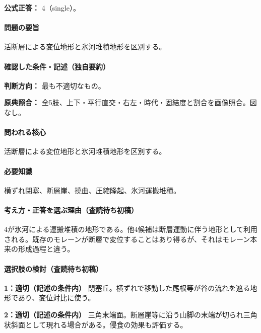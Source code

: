 \textbf{公式正答：} 4（single）。

\paragraph{問題の要旨} 活断層による変位地形と氷河堆積地形を区別する。

\paragraph{確認した条件・記述（独自要約）}\mbox{}\par

\noindent\textbf{判断方向：} 最も不適切なもの。\par

\noindent\textbf{原典照合：} 全5肢、上下・平行直交・右左・時代・固結度と割合を画像照合。図なし。\par

\paragraph{問われる核心} 活断層による変位地形と氷河堆積地形を区別する。

\paragraph{必要知識} 横ずれ閉塞、断層崖、撓曲、圧縮隆起、氷河運搬堆積。

\paragraph{考え方・正答を選ぶ理由（査読待ち初稿）} 4が氷河による運搬堆積の地形である。他4候補は断層運動に伴う地形として利用される。既存のモレーンが断層で変位することはあり得るが、それはモレーン本来の形成過程と違う。

\paragraph{選択肢の検討（査読待ち初稿）}\mbox{}\par

\noindent\textbf{1：適切（記述の条件内）} 閉塞丘。横ずれで移動した尾根等が谷の流れを遮る地形であり、変位対比に使う。\par

\noindent\textbf{2：適切（記述の条件内）} 三角末端面。断層崖等に沿う山脚の末端が切られ三角状斜面として現れる場合がある。侵食の効果も評価する。\par

